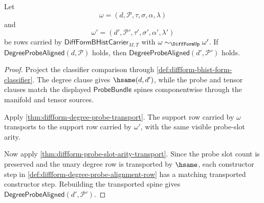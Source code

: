\begin{theorem}
\label{thm:diffform-degree-probe-alignment-transport}
Let
$$
\omega=(d,\mathcal{P},\tau,\sigma,\alpha,\lambda)
$$
and
$$
\omega'=(d',\mathcal{P}',\tau',\sigma',\alpha',\lambda')
$$
be rows carried by $\mathsf{DiffFormBHistCarrier}_{M,T}$ with
$\omega\sim_{\DiffFormUp}\omega'$. If
$\mathsf{DegreeProbeAligned}(d,\mathcal{P})$ holds, then
$\mathsf{DegreeProbeAligned}(d',\mathcal{P}')$ holds.
\end{theorem}
\begin{proof}
Project the classifier comparison through
\autoref{def:diffform-bhist-form-classifier}. The degree clause gives
$\hsame(d,d')$, while the probe and tensor clauses match the displayed
$\mathsf{ProbeBundle}$ spines componentwise through the manifold and tensor
sources.

Apply \autoref{thm:diffform-degree-probe-transport}. The support row carried
by $\omega$ transports to the support row carried by $\omega'$, with the same
visible probe-slot arity.

Now apply \autoref{thm:diffform-probe-slot-arity-transport}. Since the probe
slot count is preserved and the unary degree row is transported by $\hsame$,
each constructor step in
\autoref{def:diffform-degree-probe-alignment-row} has a matching transported
constructor step. Rebuilding the transported spine gives
$\mathsf{DegreeProbeAligned}(d',\mathcal{P}')$.
\end{proof}

